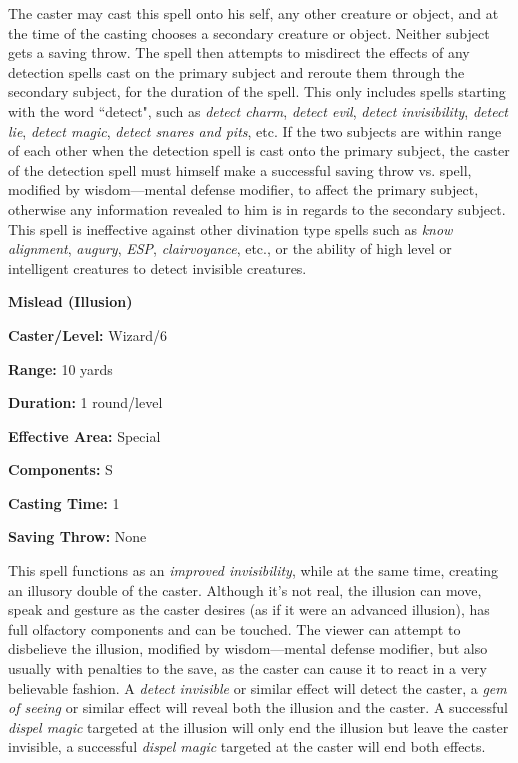 \begin{multicols}{2}
The caster may cast this spell onto his self, any other creature or object, and at the time of the casting chooses a secondary creature or object.  Neither subject gets a saving throw.  The spell then attempts to misdirect the effects of any detection spells cast on the primary subject and reroute them through the secondary subject, for the duration of the spell.  This only includes spells starting with the word ``detect", such as \textit{detect charm}, \textit{detect evil}, \textit{detect invisibility}, \textit{detect lie}, \textit{detect magic}, \textit{detect snares and pits}, etc.  If the two subjects are within range of each other when the detection spell is cast onto the primary subject, the caster of the detection spell must himself make a successful saving throw vs. spell, modified by wisdom---mental defense modifier, to affect the primary subject, otherwise any information revealed to him is in regards to the secondary subject.  This spell is ineffective against other divination type spells such as \textit{know alignment}, \textit{augury}, \textit{ESP}, \textit{clairvoyance}, etc., or the ability of high level or intelligent creatures to detect invisible creatures. 

\vspace{1em}

\noindent
\begin{minipage}{\columnwidth}

\noindent \textbf{Mislead (Illusion)}

\noindent \textbf{Caster/Level:} Wizard/6

\noindent \textbf{Range:} 10 yards

\noindent \textbf{Duration:} 1 round/level

\noindent \textbf{Effective Area:} Special

\noindent \textbf{Components:} S

\noindent \textbf{Casting Time:} 1

\noindent \textbf{Saving Throw:} None

\end{minipage}

This spell functions as an \textit{improved invisibility}, while at the same time, creating an illusory double of the caster.  Although it's not real, the illusion can move, speak and gesture as the caster desires (as if it were an advanced illusion), has full olfactory components and can be touched.  The viewer can attempt to disbelieve the illusion, modified by wisdom---mental defense modifier, but also usually with penalties to the save, as the caster can cause it to react in a very believable fashion.  A \textit{detect invisible} or similar effect will detect the caster, a \textit{gem of seeing }or similar effect will reveal both the illusion and the caster.  A successful \textit{dispel magic} targeted at the illusion will only end the illusion but leave the caster invisible, a successful \textit{dispel magic} targeted at the caster will end both effects.


\end{multicols}
